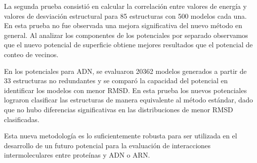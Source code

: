 \begin{singlespace}
La segunda prueba consistió en calcular la correlación entre valores de energía y valores de desviación estructural para 85 estructuras con 500 modelos cada una. 
En esta prueba no fue observada una mejora significativa del nuevo método en general.
Al analizar los componentes de los potenciales por separado observamos que el nuevo potencial de superficie obtiene mejores resultados que el potencial de conteo de vecinos.
\par
En los potenciales para ADN, se evaluaron 20362 modelos generados a partir de 33 estructuras no redundantes y se comparó la capacidad del potencial en identificar los modelos con menor RMSD.
En esta prueba los nuevos potenciales lograron clasificar las estructuras de manera equivalente al método estándar, dado que no hubo diferencias significativas en las distribuciones de menor RMSD clasificadas.
\par
Esta nueva metodología es lo suficientemente robusta para ser utilizada en el desarrollo de un futuro potencial para la evaluación de interacciones intermoleculares entre proteínas y ADN o ARN. 
\end{singlespace}
